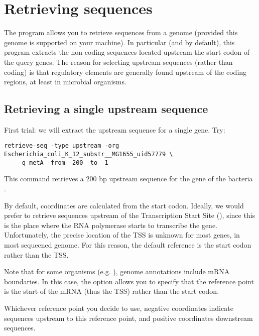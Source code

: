 \chapter{Retrieving sequences}

The program  allows you to retrieve sequences
from a genome (provided this genome is supported on your machine). In
particular (and by default), this program extracts the non-coding
sequences located upstream the start codon of the query genes. The
reason for selecting upstream sequences (rather than coding) is that
regulatory elements are generally found upstream of the coding
regions, at least in microbial organisms.

\section{Retrieving a single upstream sequence}

First trial: we will extract the upstream sequence for a single
gene. Try:

\begin{lstlisting}
retrieve-seq -type upstream -org Escherichia_coli_K_12_substr__MG1655_uid57779 \
    -q metA -from -200 -to -1
\end{lstlisting}


This command retrieves a 200 bp upstream sequence for the gene
 of the bacteria . 

By default, coordinates are calculated from the start codon. Ideally,
we would prefer to retrieve sequences upstream of the Transcription
Start Site (\concept{TSS}), since this is the place where the RNA
polymerase starts to transcribe the gene. Unfortunately, the precise
location of the TSS is unknown for most genes, in most sequecned
genome. For this reason, the default reference is the start codon
rather than the TSS.

Note that for some organisms (e.g. ), genome
annotations include mRNA boundaries. In this case, the option
 allows you to specify that the reference point
is the start of the mRNA (thus the TSS) rather than the start codon.

Whichever reference point you decide to use, negative coordinates
indicate sequences upstream to this reference point, and positive
coordinates downstream sequences. 

